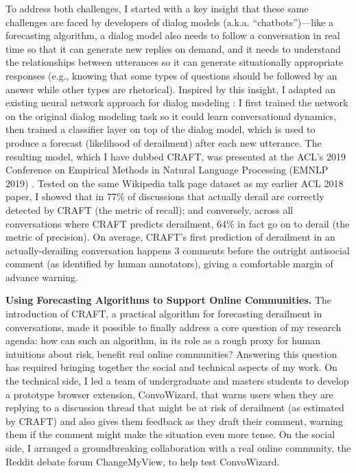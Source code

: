 \documentclass[11pt,letterpaper]{article}
\renewcommand{\section}[1]{\vspace{0.25\baselineskip}\noindent\textbf{#1.}}
\begin{document}
To address both challenges, I started with a key insight that these same challenges are faced by developers of dialog models (a.k.a. ``chatbots'')---like a forecasting algorithm, a dialog model also needs to follow a conversation in real time so that it can generate new replies on demand, and it needs to understand the relationships between utterances so it can generate situationally appropriate responses (e.g., knowing that some types of questions should be followed by an answer while other types are rhetorical).
Inspired by this insight, I adapted an existing neural network approach for dialog modeling \cite{serban_building_2016}: I first trained the network on the original dialog modeling task so it could learn conversational dynamics, then trained a classifier layer on top of the dialog model, which is used to produce a forecast (likelihood of derailment) after each new utterance.
The resulting model, which I have dubbed CRAFT, was presented at the ACL's 2019 Conference on Empirical Methods in Natural Language Processing (EMNLP 2019) \cite{chang_trouble_2019}.
Tested on the same Wikipedia talk page dataset as my earlier ACL 2018 paper, I showed that in 77\% of discussions that actually derail are correctly detected by CRAFT (the metric of recall); and conversely, across all conversations where CRAFT predicts derailment, 64\% in fact go on to derail (the metric of precision).
On average, CRAFT's first prediction of derailment in an actually-derailing conversation happens 3 comments before the outright antisocial comment (as identified by human annotators), giving a comfortable margin of advance warning.

\section{Using Forecasting Algorithms to Support Online Communities}
The introduction of CRAFT, a practical algorithm for forecasting derailment in conversations, made it possible to finally address a core question of my research agenda: how can such an algorithm, in its role as a rough proxy for human intuitions about risk, benefit real online communities?
Answering this question has required bringing together the social and technical aspects of my work.
On the technical side, I led a team of undergraduate and masters students to develop a prototype browser extension, ConvoWizard, that warns users when they are replying to a discussion thread that might be at risk of derailment (as estimated by CRAFT) and also gives them feedback as they draft their comment, warning them if the comment might make the situation even more tense.
On the social side, I arranged a groundbreaking collaboration with a real online community, the Reddit debate forum ChangeMyView, to help test ConvoWizard.
\end{document}
